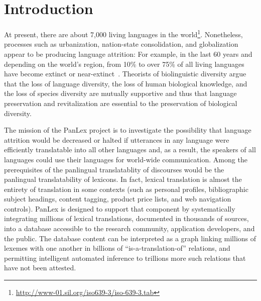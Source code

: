 \documentclass[sw]{iosart2c}
\begin{document}
\section{Introduction}
\label{sec:intro}
At present, there are about 7,000 living languages in the world\footnote{\url{http://www-01.sil.org/iso639-3/iso-639-3.tab}}.
Nonetheless, processes such as urbanization, nation-state consolidation, and globalization appear to be producing language attrition: For example, in the last 60 years and depending on the world's region, from 10\% to over 75\% of all living languages have become extinct or near-extinct~\cite{lang_crisis}.
Theorists of biolinguistic diversity argue that the loss of language diversity, the loss of human biological knowledge, and the loss of species diversity are mutually supportive and thus that language preservation and revitalization are essential to the preservation of biological diversity\cite{nettle}.

The mission of the PanLex project is to investigate the possibility that language attrition would be decreased or halted if utterances in any language were efficiently translatable into all other languages and, as a result, the speakers of all languages could use their languages for world-wide communication. Among the prerequisites of the panlingual translatablity of discourses would be the panlingual translatability of lexicons. In fact, lexical translation is almost the entirety of translation in some contexts (such as personal profiles, bibliographic subject headings, content tagging, product price lists, and web navigation controls). PanLex is designed to support that component by systematically integrating millions of lexical translations, documented in thousands of sources, into a database accessible to the research community, application developers, and the public. The database content can be interpreted as a graph linking millions of lexemes with one another in billions of ``is-a-translation-of'' relations, and permitting intelligent automated inference to trillions more such relations that have not been attested.
\end{document}
